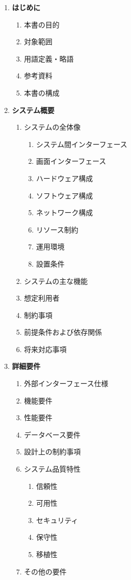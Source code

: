 \begin{enumerate}
    \item \textbf{はじめに}
    \begin{enumerate}[label=1.\arabic*]
        \item 本書の目的
        \item 対象範囲
        \item 用語定義・略語
        \item 参考資料
        \item 本書の構成
    \end{enumerate}

    \item \textbf{システム概要}
    \begin{enumerate}[label=2.\arabic*]
        \item システムの全体像
        \begin{enumerate}[label=2.1.\arabic*]
            \item システム間インターフェース
            \item 画面インターフェース
            \item ハードウェア構成
            \item ソフトウェア構成
            \item ネットワーク構成
            \item リソース制約
            \item 運用環境
            \item 設置条件
        \end{enumerate}
        \item システムの主な機能
        \item 想定利用者
        \item 制約事項
        \item 前提条件および依存関係
        \item 将来対応事項
    \end{enumerate}

    \item \textbf{詳細要件}
    \begin{enumerate}[label=3.\arabic*]
        \item 外部インターフェース仕様
        \item 機能要件
        \item 性能要件
        \item データベース要件
        \item 設計上の制約事項
        \item システム品質特性
        \begin{enumerate}[label=3.6.\arabic*]
            \item 信頼性
            \item 可用性
            \item セキュリティ
            \item 保守性
            \item 移植性
        \end{enumerate}
        \item その他の要件
    \end{enumerate}


\end{enumerate}
